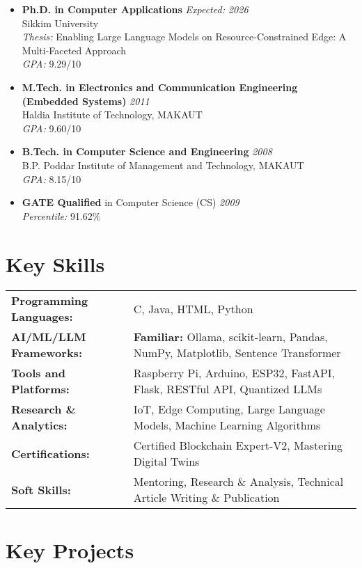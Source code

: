 \documentclass[10pt,a4paper]{article}
\begin{document}
	\begin{itemize}[leftmargin=0.15in]
		\item \textbf{Ph.D. in Computer Applications} \hfill \textit{Expected: 2026}\\
		Sikkim University \\
		\textit{Thesis:} Enabling Large Language Models on Resource-Constrained Edge: A Multi-Faceted Approach \\
		\textit{GPA:} 9.29/10
		\item \textbf{M.Tech. in Electronics and Communication Engineering (Embedded Systems)} \hfill \textit{2011}\\
		Haldia Institute of Technology, MAKAUT \\
		\textit{GPA:} 9.60/10
		\item \textbf{B.Tech. in Computer Science and Engineering} \hfill \textit{2008}\\
		B.P. Poddar Institute of Management and Technology, MAKAUT \\
		\textit{GPA:} 8.15/10
		\item \textbf{GATE Qualified} in Computer Science (CS) \hfill \textit{2009}\\
		\textit{Percentile:} 91.62\%
	\end{itemize}
	
	\section*{Key Skills}
	
	\begin{tabular}{ll}
		\textbf{Programming Languages:} &  C, Java, HTML, Python \\
		\textbf{AI/ML/LLM Frameworks:} & \textbf{Familiar:} Ollama, scikit-learn, Pandas, NumPy, Matplotlib, Sentence Transformer\\
		\textbf{Tools and Platforms:} & Raspberry Pi, Arduino, ESP32,  FastAPI, Flask, RESTful API, Quantized LLMs \\
		\textbf{Research \& Analytics:} & IoT, Edge Computing, Large Language Models, Machine Learning Algorithms \\
		\textbf{Certifications:} & Certified Blockchain Expert-V2, Mastering Digital Twins \\
		\textbf{Soft Skills:} & Mentoring, Research \& Analysis, Technical Article Writing \& Publication \\
	\end{tabular}
	
	
	\section*{Key Projects}
	
\end{document}
